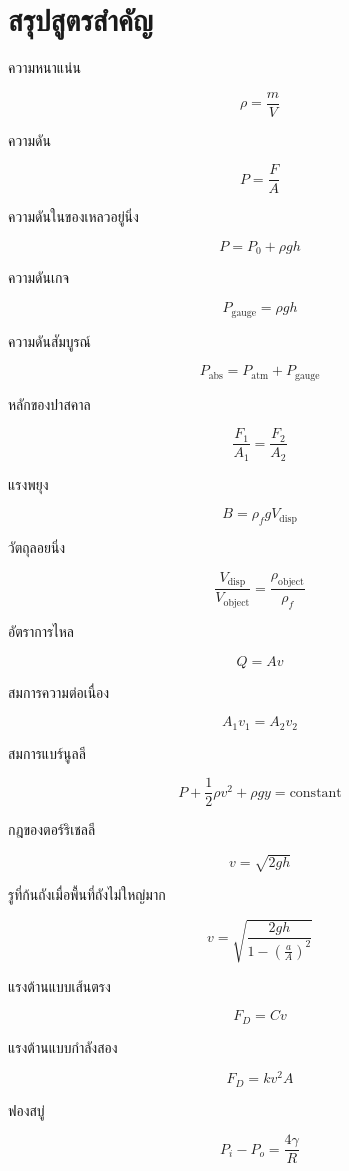 \section{สรุปสูตรสำคัญ}

\begin{tcolorbox}[title=สรุปบท: กลศาสตร์ของไหล]
ความหนาแน่น

\[
\rho=\frac{m}{V}
\]

ความดัน

\[
P=\frac{F}{A}
\]

ความดันในของเหลวอยู่นิ่ง

\[
P=P_0+\rho gh
\]

ความดันเกจ

\[
P_{\text{gauge}}=\rho gh
\]

ความดันสัมบูรณ์

\[
P_{\text{abs}}=P_{\text{atm}}+P_{\text{gauge}}
\]

หลักของปาสคาล

\[
\frac{F_1}{A_1}=\frac{F_2}{A_2}
\]

แรงพยุง

\[
B=\rho_f gV_{\text{disp}}
\]

วัตถุลอยนิ่ง

\[
\frac{V_{\text{disp}}}{V_{\text{object}}}
=
\frac{\rho_{\text{object}}}{\rho_f}
\]
\end{tcolorbox}

\begin{tcolorbox}[title=สรุปบท: กลศาสตร์ของไหล ต่อ]
อัตราการไหล

\[
Q=Av
\]

สมการความต่อเนื่อง

\[
A_1v_1=A_2v_2
\]

สมการแบร์นูลลี

\[
P+\frac{1}{2}\rho v^2+\rho gy=\text{constant}
\]

กฎของตอร์ริเชลลี

\[
v=\sqrt{2gh}
\]

รูที่ก้นถังเมื่อพื้นที่ถังไม่ใหญ่มาก

\[
v=
\sqrt{
\frac{2gh}
{1-\left(\frac{a}{A}\right)^2}
}
\]

แรงต้านแบบเส้นตรง

\[
F_D=Cv
\]

แรงต้านแบบกำลังสอง

\[
F_D=kv^2A
\]

ฟองสบู่

\[
P_i-P_o=\frac{4\gamma}{R}
\]
\end{tcolorbox}


